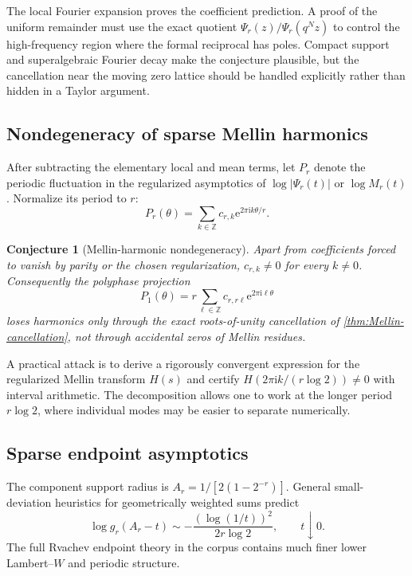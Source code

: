 \documentclass[11pt,oneside]{article}
\numberwithin{equation}{section}
\newtheorem{conjecture}[theorem]{Conjecture}
\theoremstyle{definition}
\theoremstyle{remark}
\newcommand{\Z}{\mathbb Z}
\newcommand{\e}{\mathrm e}
\newcommand{\ii}{\mathrm i}
\begin{document}
The local Fourier expansion proves the coefficient prediction.  A proof of the
uniform remainder must use the exact quotient
$\Psi_r(z)/\Psi_r(q^Nz)$ to control the high-frequency region where the formal
reciprocal has poles.  Compact support and superalgebraic Fourier decay make the
conjecture plausible, but the cancellation near the moving zero lattice should
be handled explicitly rather than hidden in a Taylor argument.

\subsection{Nondegeneracy of sparse Mellin harmonics}

After subtracting the elementary local and mean terms, let $P_r$ denote the
periodic fluctuation in the regularized asymptotics of $\log|\Psi_r(t)|$ or
$\log M_r(t)$.  Normalize its period to $r$:
\begin{equation}
 P_r(\theta)=\sum_{k\in\Z}c_{r,k}\e^{2\pi\ii k\theta/r}.  \label{eq:Pr-conj-Fourier}
\end{equation}

\begin{conjecture}[Mellin-harmonic nondegeneracy]
\label{conj:Mellin-nondegenerate}
Apart from coefficients forced to vanish by parity or the chosen
regularization, $c_{r,k}\ne0$ for every $k\ne0$.  Consequently the polyphase
projection
\begin{equation}
 P_1(\theta)=r\sum_{\ell\in\Z}c_{r,r\ell}\e^{2\pi\ii\ell\theta} \label{eq:Pr-projection-conj}
\end{equation}
loses harmonics only through the exact roots-of-unity cancellation of
\cref{thm:Mellin-cancellation}, not through accidental zeros of Mellin residues.
\end{conjecture}

A practical attack is to derive a rigorously convergent expression for the
regularized Mellin transform $H(s)$ and certify $H(2\pi\ii k/(r\log2))\ne0$
with interval arithmetic.  The decomposition allows one to work at the longer
period $r\log2$, where individual modes may be easier to separate numerically.

\subsection{Sparse endpoint asymptotics}

The component support radius is $A_r=1/[2(1-2^{-r})]$.  General small-deviation
heuristics for geometrically weighted sums predict
\begin{equation}
 \log g_r(A_r-t)
 \sim-\frac{(\log(1/t))^2}{2r\log2},
 \qquad t\downarrow0.                                    \label{eq:sparse-leading-endpoint}
\end{equation}
The full Rvachev endpoint theory in the corpus contains much finer lower
Lambert--$W$ and periodic structure.
\end{document}
